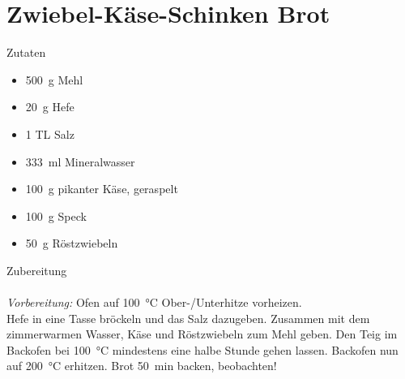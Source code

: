 \section*{Zwiebel-Käse-Schinken Brot}
\ihead{}\ohead{}
\cfoot{}
{\Large Zutaten}
\begin{multicols}{2}
\begin{itemize}
    \item \SI{500}{g} Mehl
    \item \SI{20}{g} Hefe
    \item \num{1} TL Salz
    \item \SI{333}{ml} Mineralwasser
    \item \SI{100}{g} pikanter Käse, geraspelt
    \item \SI{100}{g} Speck
    \item \SI{50}{g} Röstzwiebeln
\end{itemize}
\end{multicols}
\noindent
{\Large Zubereitung}\\
\\
\textit{Vorbereitung:} Ofen auf \SI{100}{\celsius} Ober-/Unterhitze vorheizen.\\
Hefe in eine Tasse bröckeln und das Salz dazugeben. 
Zusammen mit dem zimmerwarmen Wasser, Käse und Röstzwiebeln zum Mehl geben.
Den Teig im Backofen bei \SI{100}{\celsius} mindestens eine halbe Stunde gehen lassen.
Backofen nun auf \SI{200}{\celsius} erhitzen.
Brot \SI{50}{min} backen, beobachten!